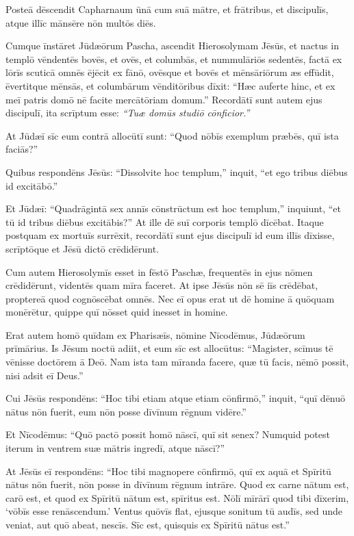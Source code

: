 \Versus Posteā dēscendit Capharnaum ūnā cum suā mātre, et frātribus, et discipulīs, atque illīc mānsēre nōn multōs diēs.

\Versus Cumque īnstāret Jūdæōrum Pascha, ascendit Hierosolymam Jēsūs,
\Versus et nactus in templō vēndentēs bovēs, et ovēs, et columbās, et nummulāriōs sedentēs,
\Versus factā ex lōrīs scuticā omnēs ējēcit ex fānō, ovēsque et bovēs et mēnsāriōrum æs effūdit, ēvertitque mēnsās,
\Versus et columbārum vēnditōribus dīxit: ``Hæc auferte hinc, et ex meī patris domō nē facite mercātōriam domum.''
\Versus Recordātī sunt autem ejus discipulī, ita scrīptum esse: \emph{``Tuæ domūs studiō cōnficior.''}

\Versus At Jūdæī sīc eum contrā allocūtī sunt: ``Quod nōbīs exemplum præbēs, quī ista faciās?''

\Versus Quibus respondēns Jēsūs: ``Dissolvite hoc templum,'' inquit, ``et ego tribus diēbus id excitābō.''

\Versus Et Jūdæī: ``Quadrāgintā sex annīs cōnstrūctum est hoc templum,'' inquiunt, ``et tū id tribus diēbus excitābis?''
\Versus At ille dē suī corporis templō dīcēbat.
\Versus Itaque postquam ex mortuīs surrēxit, recordātī sunt ejus discipulī id eum illīs dīxisse, scrīptōque et Jēsū dictō crēdidērunt.

\Versus Cum autem Hierosolymīs esset in fēstō Paschæ, frequentēs in ejus nōmen crēdidērunt, videntēs quam mīra faceret.
\Versus At ipse Jēsūs nōn sē iīs crēdēbat, proptereā quod cognōscēbat omnēs.
\Versus Nec eī opus erat ut dē homine ā quōquam monērētur, quippe quī nōsset quid inesset in homine.


\Caput
\Versus Erat autem homō quīdam ex Pharisæīs, nōmine Nīcodēmus, Jūdæōrum prīmārius.
\Versus Is Jēsum noctū adiit, et eum sīc est allocūtus: ``Magister, scīmus tē vēnisse doctōrem ā Deō. Nam ista tam mīranda facere, quæ tū facis, nēmō possit, nisi adsit eī Deus.''

\Versus Cui Jēsūs respondēns: ``Hoc tibi etiam atque etiam cōnfirmō,'' inquit, ``quī dēnuō nātus nōn fuerit, eum nōn posse dīvīnum rēgnum vidēre.''

\Versus Et Nīcodēmus: ``Quō pactō possit homō nāscī, quī sit senex? Numquid potest iterum in ventrem suæ mātris ingredī, atque nāscī?''

\Versus At Jēsūs eī respondēns: ``Hoc tibi magnopere cōnfirmō, quī ex aquā et Spīritū nātus nōn fuerit, nōn posse in dīvīnum rēgnum intrāre.
\Versus Quod ex carne nātum est, carō est, et quod ex Spīritū nātum est, spīritus est.
\Versus Nōlī mīrārī quod tibi dīxerim, `vōbīs esse renāscendum.'
\Versus Ventus quōvīs flat, ejusque sonitum tū audīs, sed unde veniat, aut quō abeat, nescīs. Sīc est, quisquis ex Spīritū nātus est.''

